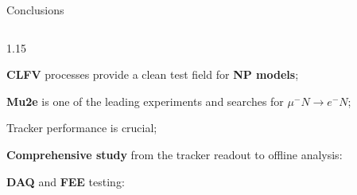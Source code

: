 \documentclass{beamer}
\begin{document}
\begin{frame}{Conclusions}
\vspace{-3mm}
\begin{columns}
\begin{column}{1.15\framewidth}
 \setlength{\leftmargini}{1.2em}
    \begin{itemize}
        {\footnotesize
\item \textbf{CLFV} processes provide a clean test field for \textbf{NP models};
\vspace{1.2mm}
\item \textbf{Mu2e} is one of the leading experiments and searches for $\mu^- N \rightarrow e^- N$;
\vspace{1.2mm}
\item Tracker performance is crucial;
\vspace{1.2mm}
    \item \textbf{Comprehensive study} from the tracker readout to offline analysis:}
   \begin{itemize}
      \vspace{1.2mm}
      {\footnotesize \item \textbf{DAQ} and \textbf{FEE} testing:}
   \vspace{1mm}
      \begin{itemize}
          

\end{itemize}
\end{itemize}
\end{itemize}
\end{column}
\end{columns}
\end{frame}
\end{document}
